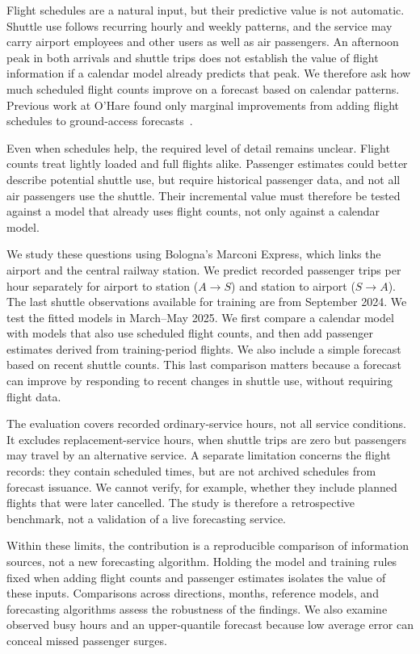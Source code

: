 \documentclass[preprint,12pt,times]{elsarticle}
\newcommand{\AS}{\ensuremath{A\!\rightarrow\!S}}
\newcommand{\SA}{\ensuremath{S\!\rightarrow\!A}}
\begin{document}
Flight schedules are a natural input, but their predictive value is not automatic. Shuttle use follows recurring hourly and weekly patterns, and the service may carry airport employees and other users as well as air passengers. An afternoon peak in both arrivals and shuttle trips does not establish the value of flight information if a calendar model already predicts that peak. We therefore ask how much scheduled flight counts improve on a forecast based on calendar patterns. Previous work at O'Hare found only marginal improvements from adding flight schedules to ground-access forecasts~\cite{ohare}.

Even when schedules help, the required level of detail remains unclear. Flight counts treat lightly loaded and full flights alike. Passenger estimates could better describe potential shuttle use, but require historical passenger data, and not all air passengers use the shuttle. Their incremental value must therefore be tested against a model that already uses flight counts, not only against a calendar model.

We study these questions using Bologna's Marconi Express, which links the airport and the central railway station. We predict recorded passenger trips per hour separately for airport to station (\AS) and station to airport (\SA). The last shuttle observations available for training are from September 2024. We test the fitted models in March--May 2025. We first compare a calendar model with models that also use scheduled flight counts, and then add passenger estimates derived from training-period flights. We also include a simple forecast based on recent shuttle counts. This last comparison matters because a forecast can improve by responding to recent changes in shuttle use, without requiring flight data.

The evaluation covers recorded ordinary-service hours, not all service conditions. It excludes replacement-service hours, when shuttle trips are zero but passengers may travel by an alternative service. A separate limitation concerns the flight records: they contain scheduled times, but are not archived schedules from forecast issuance. We cannot verify, for example, whether they include planned flights that were later cancelled. The study is therefore a retrospective benchmark, not a validation of a live forecasting service.

Within these limits, the contribution is a reproducible comparison of information sources, not a new forecasting algorithm. Holding the model and training rules fixed when adding flight counts and passenger estimates isolates the value of these inputs. Comparisons across directions, months, reference models, and forecasting algorithms assess the robustness of the findings. We also examine observed busy hours and an upper-quantile forecast because low average error can conceal missed passenger surges.
\end{document}
